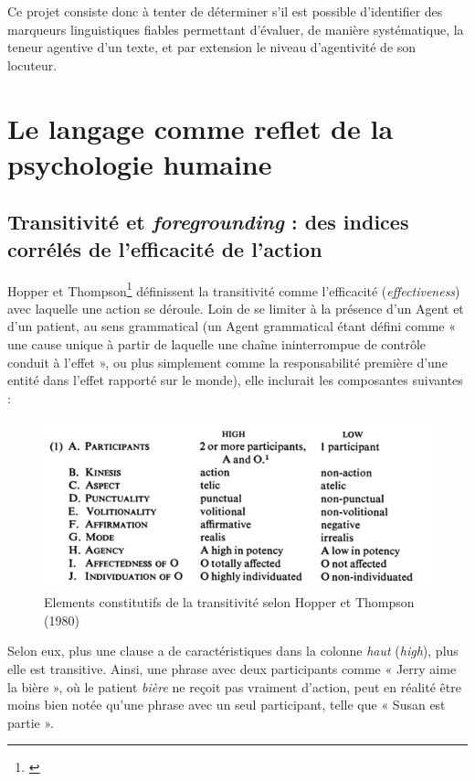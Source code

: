 Ce projet consiste donc à tenter de déterminer s’il est possible d’identifier des marqueurs linguistiques fiables permettant d’évaluer, de manière systématique, la teneur agentive d’un texte, et par extension le niveau d’agentivité de son locuteur.

\chapter{Le langage comme reflet de la psychologie humaine}

\section{Transitivité et \textit{foregrounding} : des indices corrélés de l'efficacité de l'action }

Hopper et Thompson\footnote{\cite{hopper_transitivity_1980}} définissent la transitivité comme l'efficacité (\textit{effectiveness}) avec laquelle une action se déroule. Loin de se limiter à la présence d'un Agent et d'un patient, au sens grammatical (un Agent grammatical étant défini comme « une cause unique à partir de laquelle une chaîne ininterrompue de contrôle conduit à l'effet », ou plus simplement comme la responsabilité première d'une entité dans l'effet rapporté sur le monde), elle inclurait les composantes suivantes : 

\begin{figure}[!ht]
    \centering
    \includegraphics[width=12cm]{img/Hopper_transitivity.png}
    \caption{Elements constitutifs de la transitivité selon Hopper et Thompson (1980)}
    \label{Hopper_transitivity}
\end{figure}

Selon eux, plus une clause a de caractéristiques dans la colonne \textit{haut} (\textit{high}), plus elle est transitive. Ainsi, une phrase avec deux participants comme « Jerry aime la bière », où le patient \textit{bière} ne reçoit pas vraiment d'action, peut en réalité être moins bien notée qu'une phrase avec un seul participant, telle que « Susan est partie ».

